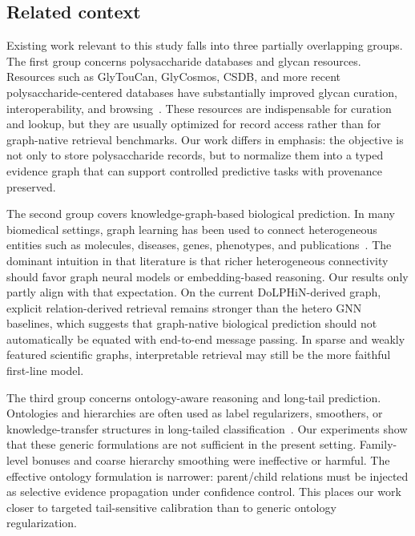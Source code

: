 \documentclass[11pt]{article}
\begin{document}
\subsection{Related context}
\label{sec:related-work}

Existing work relevant to this study falls into three partially overlapping groups. The first group concerns polysaccharide databases and glycan resources. Resources such as GlyTouCan, GlyCosmos, CSDB, and more recent polysaccharide-centered databases have substantially improved glycan curation, interoperability, and browsing~\cite{aoki2016glytoucan,yamada2020glycosmos,toukach2015csdb,xin2025dolphin}. These resources are indispensable for curation and lookup, but they are usually optimized for record access rather than for graph-native retrieval benchmarks. Our work differs in emphasis: the objective is not only to store polysaccharide records, but to normalize them into a typed evidence graph that can support controlled predictive tasks with provenance preserved.

The second group covers knowledge-graph-based biological prediction. In many biomedical settings, graph learning has been used to connect heterogeneous entities such as molecules, diseases, genes, phenotypes, and publications~\cite{zhou2020biomedicalkg,chandak2023primekg,crichton2018linkprediction,gema2024kgembeddings,zhao2024community}. The dominant intuition in that literature is that richer heterogeneous connectivity should favor graph neural models or embedding-based reasoning. Our results only partly align with that expectation. On the current DoLPHiN-derived graph, explicit relation-derived retrieval remains stronger than the hetero GNN baselines, which suggests that graph-native biological prediction should not automatically be equated with end-to-end message passing. In sparse and weakly featured scientific graphs, interpretable retrieval may still be the more faithful first-line model.

The third group concerns ontology-aware reasoning and long-tail prediction. Ontologies and hierarchies are often used as label regularizers, smoothers, or knowledge-transfer structures in long-tailed classification~\cite{li2021hierarchical,liu2024multigranularity}. Our experiments show that these generic formulations are not sufficient in the present setting. Family-level bonuses and coarse hierarchy smoothing were ineffective or harmful. The effective ontology formulation is narrower: parent/child relations must be injected as selective evidence propagation under confidence control. This places our work closer to targeted tail-sensitive calibration than to generic ontology regularization.
\end{document}
